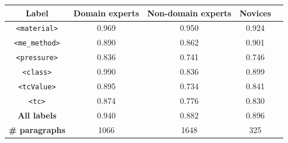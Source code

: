 \documentclass[]{interact}
\theoremstyle{plain}%
\theoremstyle{definition}
\theoremstyle{remark}
\begin{document}
\begin{table}[ht]
    {\begin{tabular}{ ccccc } 
    \toprule
        \textbf{Label} & \textbf{Domain experts} & \textbf{Non-domain experts} & \textbf{Novices}\\
    \midrule
        \texttt{<material>}     &   0.969   & 0.950    &   0.924   \\
        \texttt{<me\_method>}   &   0.890   & 0.862    &   0.901   \\
        \texttt{<pressure>}     &   0.836   & 0.741    &   0.746   \\
        \texttt{<class>}        &   0.990   & 0.836	   &   0.899   \\
        \texttt{<tcValue>}      &   0.895   & 0.734	   &   0.841   \\
        \texttt{<tc>}           &   0.874   & 0.776	   &   0.830   \\
    \midrule
        \textbf{All labels}        &	0.940   &   0.882	&      0.896   \\
    \midrule
        \textbf{\# paragraphs}  &   1066   &  1648	    &   325     \\
    \bottomrule
    \end{tabular}}
   
    \label{table:comparison-iaa-nde-de}
\end{table}
\end{document}
